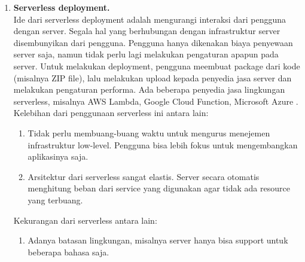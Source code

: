 \begin{enumerate}[leftmargin=*]
\begin{adjustbox}{width=1\textwidth}
	\centering
	\begin{minipage}{\linewidth}
	\end{minipage}
\end{adjustbox}\\
	\item \textbf{Serverless deployment.}\\
	Ide dari serverless deployment adalah mengurangi interaksi dari pengguna dengan server. Segala hal yang berhubungan dengan infrastruktur server disembunyikan dari pengguna. Pengguna hanya dikenakan biaya penyewaan server saja, namun tidak perlu lagi melakukan pengaturan apapun pada server. Untuk melakukan deployment, pengguna meembuat package dari kode (misalnya ZIP file), lalu melakukan upload kepada penyedia jasa server dan melakukan pengaturan performa. Ada beberapa penyedia jasa lingkungan serverless, misalnya AWS Lambda, Google Cloud Function, Microsoft Azure \cite{6}.\\
	Kelebihan dari penggunaan serverless ini antara lain:
	\begin{enumerate}[leftmargin=*]
		\item Tidak perlu membuang-buang waktu untuk mengurus menejemen infrastruktur low-level. Pengguna bisa lebih fokus untuk mengembangkan aplikasinya saja.
		\item Arsitektur dari serverless sangat elastis. Server secara otomatis menghitung beban dari service yang digunakan agar tidak ada resource yang terbuang.
	\end{enumerate}
	Kekurangan dari serverless antara lain:
	\begin{enumerate}[leftmargin=*]
		\item Adanya batasan lingkungan, misalnya server hanya bisa support untuk beberapa bahasa saja.
	\end{enumerate}
\end{enumerate}

